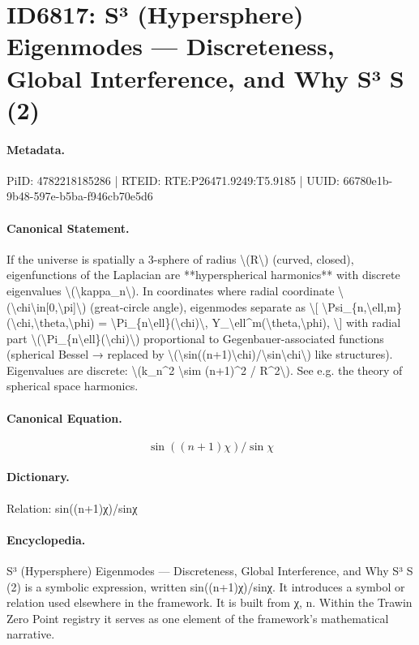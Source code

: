 \section*{ID6817: S³ (Hypersphere) Eigenmodes — Discreteness, Global Interference, and Why S³ S (2)}
\paragraph{Metadata.}
PiID: 4782218185286 | RTEID: RTE:P26471.9249:T5.9185 | UUID: 66780e1b-9b48-597e-b5ba-f946cb70e5d6

\paragraph{Canonical Statement.}
If the universe is spatially a 3-sphere of radius \textbackslash{}(R\textbackslash{}) (curved, closed), eigenfunctions of the Laplacian are **hyperspherical harmonics** with discrete eigenvalues \textbackslash{}(\textbackslash{}kappa\_n\textbackslash{}). In coordinates where radial coordinate \textbackslash{}(\textbackslash{}chi\textbackslash{}in[0,\textbackslash{}pi]\textbackslash{}) (great-circle angle), eigenmodes separate as \textbackslash{}[ \textbackslash{}Psi\_\{n,\textbackslash{}ell,m\}(\textbackslash{}chi,\textbackslash{}theta,\textbackslash{}phi) = \textbackslash{}Pi\_\{n\textbackslash{}ell\}(\textbackslash{}chi)\textbackslash{}, Y\_\textbackslash{}ell\textasciicircum{}m(\textbackslash{}theta,\textbackslash{}phi), \textbackslash{}] with radial part \textbackslash{}(\textbackslash{}Pi\_\{n\textbackslash{}ell\}(\textbackslash{}chi)\textbackslash{}) proportional to Gegenbauer-associated functions (spherical Bessel → replaced by \textbackslash{}(\textbackslash{}sin((n+1)\textbackslash{}chi)/\textbackslash{}sin\textbackslash{}chi\textbackslash{}) like structures). Eigenvalues are discrete: \textbackslash{}(k\_n\textasciicircum{}2 \textbackslash{}sim (n+1)\textasciicircum{}2 / R\textasciicircum{}2\textbackslash{}). See e.g. the theory of spherical space harmonics.

\paragraph{Canonical Equation.}
\[
\sin((n+1)\chi)/\sin\chi
\]

\paragraph{Dictionary.}
Relation: sin((n+1)χ)/sinχ

\paragraph{Encyclopedia.}
S³ (Hypersphere) Eigenmodes — Discreteness, Global Interference, and Why S³ S (2) is a symbolic expression, written sin((n+1)χ)/sinχ. It introduces a symbol or relation used elsewhere in the framework. It is built from χ, n. Within the Trawin Zero Point registry it serves as one element of the framework's mathematical narrative.
